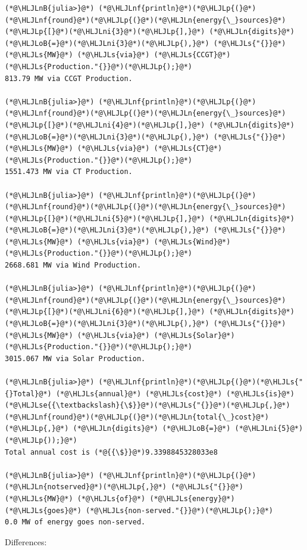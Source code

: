 \documentclass[12pt,a4paper]{article}
\newcommand{\HLJLn}[1]{#1}
\newcommand{\HLJLnf}[1]{\textcolor[RGB]{66,102,213}{#1}}
\newcommand{\HLJLs}[1]{\textcolor[RGB]{201,61,57}{#1}}
\newcommand{\HLJLse}[1]{\textcolor[RGB]{59,151,46}{#1}}
\newcommand{\HLJLnB}[1]{\textcolor[RGB]{59,151,46}{#1}}
\newcommand{\HLJLni}[1]{\textcolor[RGB]{59,151,46}{#1}}
\newcommand{\HLJLoB}[1]{\textcolor[RGB]{102,102,102}{\textbf{#1}}}
\newcommand{\HLJLp}[1]{#1}
\begin{document}
\begin{lstlisting}
(*@\HLJLnB{julia>}@*) (*@\HLJLnf{println}@*)(*@\HLJLp{(}@*)(*@\HLJLnf{round}@*)(*@\HLJLp{(}@*)(*@\HLJLn{energy{\_}sources}@*)(*@\HLJLp{[}@*)(*@\HLJLni{3}@*)(*@\HLJLp{],}@*) (*@\HLJLn{digits}@*) (*@\HLJLoB{=}@*)(*@\HLJLni{3}@*)(*@\HLJLp{),}@*) (*@\HLJLs{"{}}@*) (*@\HLJLs{MW}@*) (*@\HLJLs{via}@*) (*@\HLJLs{CCGT}@*) (*@\HLJLs{Production."{}}@*)(*@\HLJLp{);}@*)
813.79 MW via CCGT Production.

(*@\HLJLnB{julia>}@*) (*@\HLJLnf{println}@*)(*@\HLJLp{(}@*)(*@\HLJLnf{round}@*)(*@\HLJLp{(}@*)(*@\HLJLn{energy{\_}sources}@*)(*@\HLJLp{[}@*)(*@\HLJLni{4}@*)(*@\HLJLp{],}@*) (*@\HLJLn{digits}@*) (*@\HLJLoB{=}@*)(*@\HLJLni{3}@*)(*@\HLJLp{),}@*) (*@\HLJLs{"{}}@*) (*@\HLJLs{MW}@*) (*@\HLJLs{via}@*) (*@\HLJLs{CT}@*) (*@\HLJLs{Production."{}}@*)(*@\HLJLp{);}@*)
1551.473 MW via CT Production.

(*@\HLJLnB{julia>}@*) (*@\HLJLnf{println}@*)(*@\HLJLp{(}@*)(*@\HLJLnf{round}@*)(*@\HLJLp{(}@*)(*@\HLJLn{energy{\_}sources}@*)(*@\HLJLp{[}@*)(*@\HLJLni{5}@*)(*@\HLJLp{],}@*) (*@\HLJLn{digits}@*) (*@\HLJLoB{=}@*)(*@\HLJLni{3}@*)(*@\HLJLp{),}@*) (*@\HLJLs{"{}}@*) (*@\HLJLs{MW}@*) (*@\HLJLs{via}@*) (*@\HLJLs{Wind}@*) (*@\HLJLs{Production."{}}@*)(*@\HLJLp{);}@*)
2668.681 MW via Wind Production.

(*@\HLJLnB{julia>}@*) (*@\HLJLnf{println}@*)(*@\HLJLp{(}@*)(*@\HLJLnf{round}@*)(*@\HLJLp{(}@*)(*@\HLJLn{energy{\_}sources}@*)(*@\HLJLp{[}@*)(*@\HLJLni{6}@*)(*@\HLJLp{],}@*) (*@\HLJLn{digits}@*) (*@\HLJLoB{=}@*)(*@\HLJLni{3}@*)(*@\HLJLp{),}@*) (*@\HLJLs{"{}}@*) (*@\HLJLs{MW}@*) (*@\HLJLs{via}@*) (*@\HLJLs{Solar}@*) (*@\HLJLs{Production."{}}@*)(*@\HLJLp{);}@*)
3015.067 MW via Solar Production.

(*@\HLJLnB{julia>}@*) (*@\HLJLnf{println}@*)(*@\HLJLp{(}@*)(*@\HLJLs{"{}Total}@*) (*@\HLJLs{annual}@*) (*@\HLJLs{cost}@*) (*@\HLJLs{is}@*) (*@\HLJLse{{\textbackslash}{\$}}@*)(*@\HLJLs{"{}}@*)(*@\HLJLp{,}@*) (*@\HLJLnf{round}@*)(*@\HLJLp{(}@*)(*@\HLJLn{total{\_}cost}@*)(*@\HLJLp{,}@*) (*@\HLJLn{digits}@*) (*@\HLJLoB{=}@*) (*@\HLJLni{5}@*)(*@\HLJLp{));}@*)
Total annual cost is (*@{{\$}}@*)9.3398845328033e8

(*@\HLJLnB{julia>}@*) (*@\HLJLnf{println}@*)(*@\HLJLp{(}@*)(*@\HLJLn{notserved}@*)(*@\HLJLp{,}@*) (*@\HLJLs{"{}}@*) (*@\HLJLs{MW}@*) (*@\HLJLs{of}@*) (*@\HLJLs{energy}@*) (*@\HLJLs{goes}@*) (*@\HLJLs{non-served."{}}@*)(*@\HLJLp{);}@*)
0.0 MW of energy goes non-served.
\end{lstlisting}

Differences:
\end{document}
